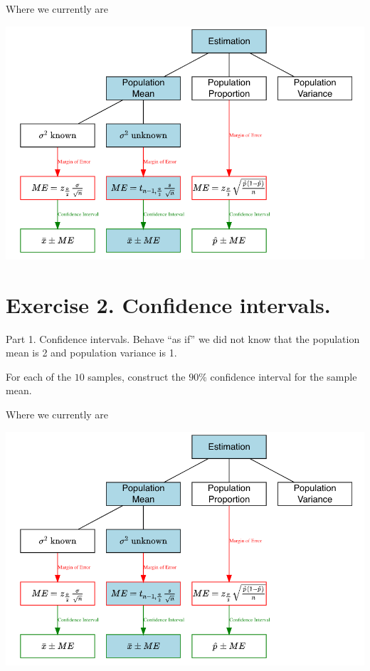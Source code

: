 \documentclass[
  10pt,
  ignorenonframetext,
]{beamer}
\begin{document}
\begin{frame}{Where we currently are}
\protect\hypertarget{where-we-currently-are-1}{}
\begin{center}\includegraphics[width=0.9\linewidth]{pictures/EstimationGuide-Case2} \end{center}
\end{frame}

\hypertarget{exercise-2.-confidence-intervals.}{%
\section{Exercise 2. Confidence
intervals.}\label{exercise-2.-confidence-intervals.}}

\begin{frame}{Part 1. Confidence intervals.}
\protect\hypertarget{part-1.-confidence-intervals.}{}
Behave ``as if'' we did not know that the population mean is 2 and
population variance is 1.

For each of the \(10\) samples, construct the \(90\%\) confidence
interval for the sample mean.
\end{frame}

\begin{frame}{Where we currently are}
\protect\hypertarget{where-we-currently-are-2}{}
\begin{center}\includegraphics[width=0.9\linewidth]{pictures/EstimationGuide-Case2} \end{center}
\end{frame}
\end{document}
